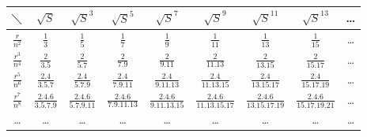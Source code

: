 \documentclass[11pt]{article}
\begin{document}
\begin{center}
\renewcommand{\arraystretch}{1.8}
\begin{tabular}{|c||c|c|c|c|c|c|c|c|}
\hline
$\diagdown$ & $\sqrt{S}$ & $\sqrt{S}^{3}$ & $\sqrt{S}^{5}$ & $\sqrt{S}^{7}$ & $\sqrt{S}^{9}$ & $\sqrt{S}^{11}$ & $\sqrt{S}^{13}$ & \dots \\
\hline\hline
$\frac{r}{n^2}$ & $\frac{1}{3}$ & $\frac{1}{5}$ & $\frac{1}{7}$ & $\frac{1}{9}$ & $\frac{1}{11}$ & $\frac{1}{13}$ & $\frac{1}{15}$ & \dots \\
\hline
$\frac{r^3}{n^4}$ & $\frac{2}{3.5}$ & $\frac{2}{5.7}$ & $\frac{2}{7.9}$ & $\frac{2}{9.11}$ & $\frac{2}{11.13}$ & $\frac{2}{13.15}$ & $\frac{2}{15.17}$ & \dots \\
\hline
$\frac{r^5}{n^6}$ & $\frac{2.4}{3.5.7}$ & $\frac{2.4}{5.7.9}$ & $\frac{2.4}{7.9.11}$ & $\frac{2.4}{9.11.13}$ & $\frac{2.4}{11.13.15}$ & $\frac{2.4}{13.15.17}$ & $\frac{2.4}{15.17.19}$ & \dots \\
\hline
$\frac{r^7}{n^8}$ & $\frac{2.4.6}{3.5.7.9}$ & $\frac{2.4.6}{5.7.9.11}$ & $\frac{2.4.6}{7.9.11.13}$ & $\frac{2.4.6}{9.11.13.15}$ & $\frac{2.4.6}{11.13.15.17}$ & $\frac{2.4.6}{13.15.17.19}$ & $\frac{2.4.6}{15.17.19.21}$ & \dots \\
\hline
\dots & \dots & \dots & \dots & \dots & \dots & \dots & \dots & \dots \\
\hline
\end{tabular}
\end{center}
\end{document}
